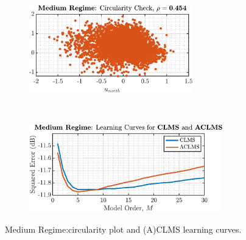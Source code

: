 \begin{enumerate}[label=\alph*), leftmargin=*]
\begin{figure}[h]
    \centering
    \begin{subfigure}{0.49\textwidth}
        \centering
        \includegraphics[height=1.5in]{report/widely-linear-filtering-and-adaptive-spectrum-estimation/complex-LMS-and-widely-linear-modelling/assets/b/circularity_2}
    \end{subfigure}
    ~
    \begin{subfigure}{0.49\textwidth}
        \centering
        \includegraphics[height=1.5in]{report/widely-linear-filtering-and-adaptive-spectrum-estimation/complex-LMS-and-widely-linear-modelling/assets/b/learning_curves_2}
    \end{subfigure}
    \caption{Medium Regime:circularity plot and (A)CLMS learning curves.}
    \label{fig:4_1_b_2}
\end{figure}


\end{enumerate}
